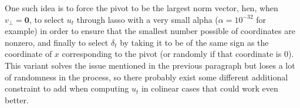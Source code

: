 \documentclass[12pt]{article}
\begin{document}
One such idea is to force the pivot to be the largest norm vector, hen, when $v_\perp=\textbf{0}$, to select $u_t$ through lasso with a very small alpha ($\alpha=10^{-32}$ for example) in order to ensure that the smallest number possible of coordinates are nonzero, and finally to select $\delta_t$ by taking it to be of the same sign as the coordinate of $x$ corresponding to the pivot (or randomly if that coordinate is 0). This variant solves the issue mentioned in the previous paragraph but loses a lot of randomness in the process, so there probably exist some different additional constraint to add when computing $u_t$ in colinear cases that could work even better.
\newpage


\newpage
%
%

\end{document}
